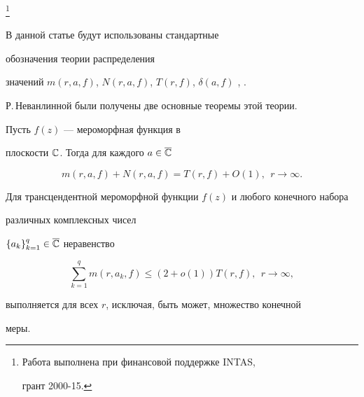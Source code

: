 \thanks{Работа выполнена при финансовой поддержке INTAS,


грант 2000-15.}





\date{}




\pagestyle{plain} %







\maketitle


\label{begin}








В данной статье будут использованы стандартные 


обозначения теории распределения


значений $m(r,a,f)$, $N(r,a,f)$, $T(r,f)$, $\delta(a,f)$ \cite{1}, \cite{2}.


Р.\,Неванлинной были получены две основные теоремы этой теории.





\begin{atheorem}\label{th:a}


Пусть $f(z)$ --- мероморфная функция в


плоскости $\Bbb C$. Тогда для каждого $a\in\overline{\Bbb C}$


\begin{equation}


m(r,a,f) + N (r,a,f) = T (r,f) + O(1), \ \  r\to \infty.


\end{equation}


\end{atheorem}





\begin{atheorem}\label{th:b}


Для трансцендентной мероморфной функции  $f(z)$ и любого конечного набора


различных комплексных чисел


$\{a_k\}_{k=1}^{q}\in\overline{\Bbb C}$ неравенство 


\begin{equation}


\sum_{k=1}^{q}m(r,a_k,f) \le (2 + o(1))T(r,f), \ \ r\to \infty,


\end{equation}


выполняется для всех $r$, исключая, быть может, множество конечной


меры.


\end{atheorem}





